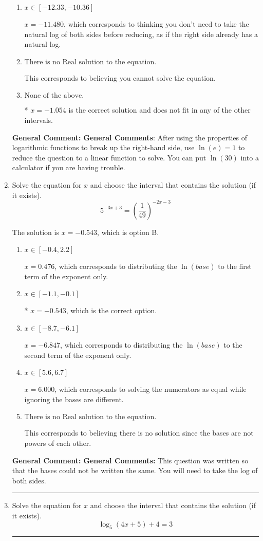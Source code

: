 \documentclass{extbook}[14pt]
\newcommand{\litem}[1]{\item #1

\rule{\textwidth}{0.4pt}}
\begin{document}
\begin{enumerate}
{\begin{enumerate}[label=\Alph*.]
$x = 1.054$, which is the negative of the correct solution.
\item \( x \in [-12.33, -10.36] \)

$x = -11.480$, which corresponds to thinking you don't need to take the natural log of both sides before reducing, as if the right side already has a natural log.
\item \( \text{There is no Real solution to the equation.} \)

This corresponds to believing you cannot solve the equation.
\item \( \text{None of the above.} \)

* $x = -1.054$ is the correct solution and does not fit in any of the other intervals.
\end{enumerate}

\textbf{General Comment:} \textbf{General Comments}: After using the properties of logarithmic functions to break up the right-hand side, use $\ln(e) = 1$ to reduce the question to a linear function to solve. You can put $\ln(30)$ into a calculator if you are having trouble.
}
\litem{
Solve the equation for $x$ and choose the interval that contains the solution (if it exists).
\[ 5^{-3x+3} = \left(\frac{1}{49}\right)^{-2x-3} \]

The solution is \( x = -0.543 \), which is option B.\begin{enumerate}[label=\Alph*.]
\item \( x \in [-0.4, 2.2] \)

$x = 0.476$, which corresponds to distributing the $\ln(base)$ to the first term of the exponent only.
\item \( x \in [-1.1, -0.1] \)

* $x = -0.543$, which is the correct option.
\item \( x \in [-8.7, -6.1] \)

$x = -6.847$, which corresponds to distributing the $\ln(base)$ to the second term of the exponent only.
\item \( x \in [5.6, 6.7] \)

$x = 6.000$, which corresponds to solving the numerators as equal while ignoring the bases are different.
\item \( \text{There is no Real solution to the equation.} \)

This corresponds to believing there is no solution since the bases are not powers of each other.
\end{enumerate}

\textbf{General Comment:} \textbf{General Comments:} This question was written so that the bases could not be written the same. You will need to take the log of both sides.
}
\litem{
Solve the equation for $x$ and choose the interval that contains the solution (if it exists).
\[ \log_{5}{(4x+5)}+4 = 3 \]

}
\end{enumerate}
\end{document}

